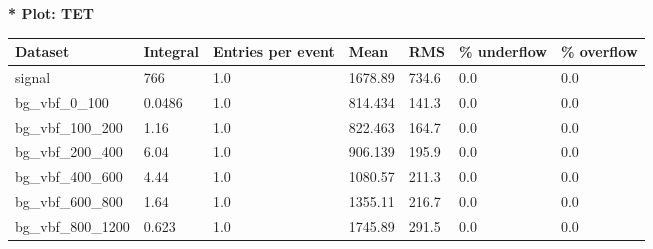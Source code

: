 \documentclass[a4paper, 10pt]{article}
\begin{document}
\textbf{* Plot: TET}\\
   \begin{table}[H]
  \begin{center}
    \begin{tabular}{|m{23.0mm}|m{23.0mm}|m{18.0mm}|m{19.0mm}|m{19.0mm}|m{19.0mm}|m{19.0mm}|}
      \hline
      {\cellcolor{yellow}         Dataset}& {\cellcolor{yellow}         Integral}& {\cellcolor{yellow}         Entries per event}& {\cellcolor{yellow}         Mean}& {\cellcolor{yellow}         RMS}& {\cellcolor{yellow}         \% underflow}& {\cellcolor{yellow}         \% overflow}\\
      \hline
      {\cellcolor{white}         signal}& {\cellcolor{white}         766}& {\cellcolor{white}         1.0}& {\cellcolor{white}         1678.89}& {\cellcolor{white}         734.6}& {\cellcolor{green}         0.0}& {\cellcolor{green}         0.0}\\
      \hline
      {\cellcolor{white}         bg\_vbf\_0\_100}& {\cellcolor{white}         0.0486}& {\cellcolor{white}         1.0}& {\cellcolor{white}         814.434}& {\cellcolor{white}         141.3}& {\cellcolor{green}         0.0}& {\cellcolor{green}         0.0}\\
      \hline
      {\cellcolor{white}         bg\_vbf\_100\_200}& {\cellcolor{white}         1.16}& {\cellcolor{white}         1.0}& {\cellcolor{white}         822.463}& {\cellcolor{white}         164.7}& {\cellcolor{green}         0.0}& {\cellcolor{green}         0.0}\\
      \hline
      {\cellcolor{white}         bg\_vbf\_200\_400}& {\cellcolor{white}         6.04}& {\cellcolor{white}         1.0}& {\cellcolor{white}         906.139}& {\cellcolor{white}         195.9}& {\cellcolor{green}         0.0}& {\cellcolor{green}         0.0}\\
      \hline
      {\cellcolor{white}         bg\_vbf\_400\_600}& {\cellcolor{white}         4.44}& {\cellcolor{white}         1.0}& {\cellcolor{white}         1080.57}& {\cellcolor{white}         211.3}& {\cellcolor{green}         0.0}& {\cellcolor{green}         0.0}\\
      \hline
      {\cellcolor{white}         bg\_vbf\_600\_800}& {\cellcolor{white}         1.64}& {\cellcolor{white}         1.0}& {\cellcolor{white}         1355.11}& {\cellcolor{white}         216.7}& {\cellcolor{green}         0.0}& {\cellcolor{green}         0.0}\\
      \hline
      {\cellcolor{white}         bg\_vbf\_800\_1200}& {\cellcolor{white}         0.623}& {\cellcolor{white}         1.0}& {\cellcolor{white}         1745.89}& {\cellcolor{white}         291.5}& {\cellcolor{green}         0.0}& {\cellcolor{green}         0.0}\\

\end{tabular}
\end{center}
\end{table}
\end{document}
